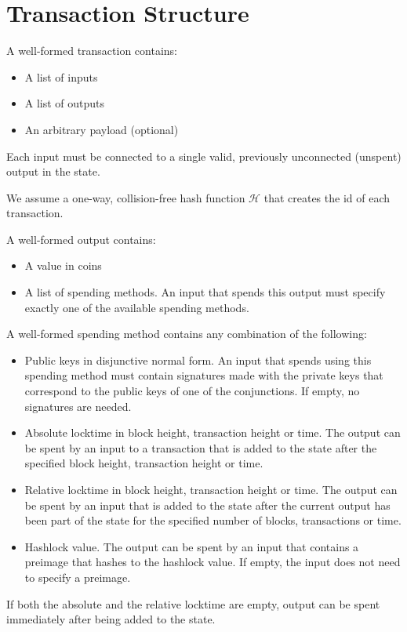 \section{Transaction Structure}
  A well-formed transaction contains:
  \begin{itemize}
    \item A list of inputs
    \item A list of outputs
    \item An arbitrary payload (optional)
  \end{itemize}
  Each input must be connected to a single valid, previously unconnected
  (unspent) output in the state.

  We assume a one-way, collision-free hash function $\mathcal{H}$ that creates
  the id of each transaction.

  A well-formed output contains:
  \begin{itemize}
    \item A value in coins
    \item A list of spending methods. An input that spends this output must
    specify exactly one of the available spending methods.
  \end{itemize}

  A well-formed spending method contains any combination of the following:
  \begin{itemize}
    \item Public keys in disjunctive normal form. An input that spends using
    this spending method must contain signatures made with the private keys that
    correspond to the public keys of one of the conjunctions. If empty, no
    signatures are needed.
    \item Absolute locktime in block height, transaction height or time. The
    output can be spent by an input to a transaction that is added to the state
    after the specified block height, transaction height or time.
    \item Relative locktime in block height, transaction height or time. The
    output can be spent by an input that is added to the state after the current
    output has been part of the state for the specified number of blocks,
    transactions or time.
    \item Hashlock value. The output can be spent by an input that contains a
    preimage that hashes to the hashlock value. If empty, the input does not
    need to specify a preimage.
  \end{itemize}
  If both the absolute and the relative locktime are empty, output can be spent
  immediately after being added to the state.

